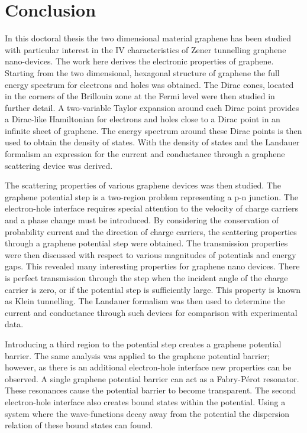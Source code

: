 %
	\chapter{Conclusion}
	\label{Conclusion}

		In this doctoral thesis the two dimensional material graphene has been studied with particular interest in the IV characteristics of Zener tunnelling graphene nano-devices. The work here derives the electronic properties of graphene. Starting from the two dimensional, hexagonal structure of graphene the full energy spectrum for electrons and holes was obtained. The Dirac cones, located in the corners of the Brillouin zone at the Fermi level were then studied in further detail. A two-variable Taylor expansion around each Dirac point provides a Dirac-like Hamiltonian for electrons and holes close to a Dirac point in an infinite sheet of graphene. The energy spectrum around these Dirac points is then used to obtain the density of states. With the density of states and the Landauer formalism an expression for the current and conductance through a graphene scattering device was derived.

		The scattering properties of various graphene devices was then studied. The graphene potential step is a two-region problem representing a p-n junction. The electron-hole interface requires special attention to the velocity of charge carriers and a phase change must be introduced. By considering the conservation of probability current and the direction of charge carriers, the scattering properties through a graphene potential step were obtained. The transmission properties were then discussed with respect to various magnitudes of potentials and energy gaps. This revealed many interesting properties for graphene nano devices. There is perfect transmission through the step when the incident angle of the charge carrier is zero, or if the potential step is sufficiently large. This property is known as Klein tunnelling. The Landauer formalism was then used to determine the current and conductance through such devices for comparison with experimental data.

		Introducing a third region to the potential step creates a graphene potential barrier. The same analysis was applied to the graphene potential barrier; however, as there is an additional electron-hole interface new properties can be observed. A single graphene potential barrier can act as a Fabry-P\'{e}rot resonator. These resonances cause the potential barrier to become transparent. The second electron-hole interface also creates bound states within the potential. Using a system where the wave-functions decay away from the potential the dispersion relation of these bound states can found.

